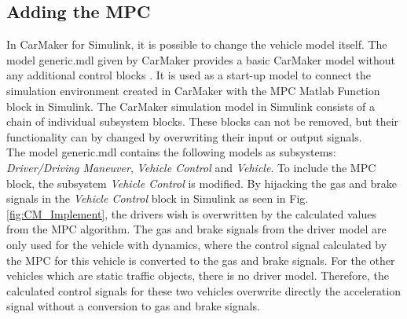 \documentclass[letterpaper,10pt,conference]{ieeeconf}
\begin{document}
\subsection{Adding the MPC}
In CarMaker for Simulink, it is possible to change the vehicle model itself. The model generic.mdl given by CarMaker provides a basic CarMaker model without any additional control blocks \cite{qsguide}. It is used as a start-up model to connect the simulation environment created in CarMaker with the MPC Matlab Function block in Simulink. The CarMaker simulation model in Simulink consists of a chain of individual subsystem blocks. These blocks can not be removed, but their functionality can by changed by overwriting their input or output signals.\\ \indent
The model generic.mdl contains the following models as subsystems: \textit{Driver/Driving Maneuver}, \textit{Vehicle Control} and \textit{Vehicle}. To include the MPC block, the subsystem \textit{Vehicle Control} is modified.
By hijacking the gas and brake signals in the \textit{Vehicle Control} block in Simulink as seen in Fig. \ref{fig:CM_Implement}, the drivers wish is overwritten by the calculated values from the MPC algorithm. The gas and brake signals from the driver model are only used for the vehicle with dynamics, where the control signal calculated by the MPC for this vehicle is converted to the gas and brake signals. For the other vehicles which are static traffic objects, there is no driver model. Therefore, the calculated control signals for these two vehicles overwrite directly the acceleration signal without a conversion to gas and brake signals.
\end{document}
